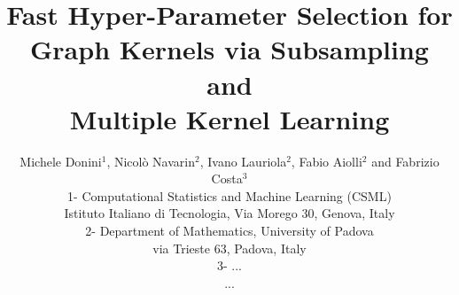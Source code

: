 \documentclass{esannV2}
\newcommand{\1}{{\bf 1}}
\renewcommand{\baselinestretch}{.96}
\begin{document}
\title{Fast Hyper-Parameter Selection for Graph Kernels via Subsampling and\\Multiple Kernel Learning}

\author{Michele Donini$^1$, Nicol\`o Navarin$^2$, Ivano Lauriola$^2$, Fabio Aiolli$^2$ and Fabrizio Costa$^3$
%
%
\vspace{.3cm}\\
%
1- Computational Statistics and Machine Learning (CSML) \\
Istituto Italiano di Tecnologia, Via Morego 30, Genova, Italy
\vspace{.1cm}\\
2- Department of Mathematics, University of Padova\\
via Trieste 63, Padova, Italy
\vspace{.1cm}\\
3- ... \\
...
}

%

\maketitle

\end{document}
